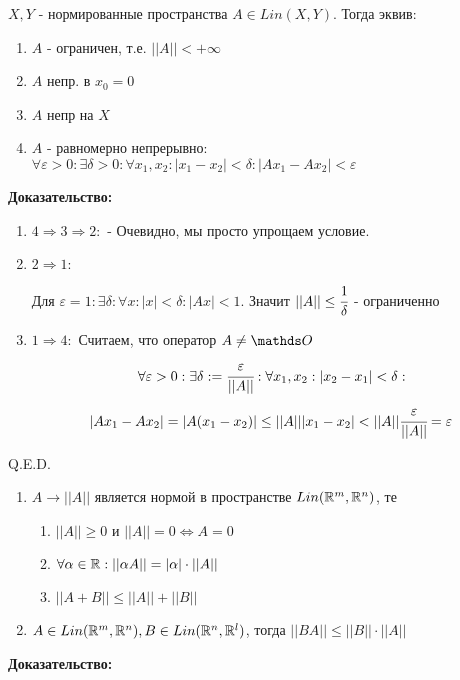 $X,Y$ - нормированные пространства $A \in Lin(X,Y)$. Тогда эквив:

\begin{enumerate}
    \item $A$ - ограничен, т.е. $||A|| < + \infty$
    \item $A$ непр. в $x_0 = 0$
    \item $A$ непр на $X$
    \item $A$ - равномерно непрерывно: $\forall \varepsilon >0:\exists \delta >0:\forall x_1,x_2:|x_1-x_2|<\delta: |Ax_1-Ax_2|<\varepsilon$
\end{enumerate}

\textbf{Доказательство:}

\begin{enumerate}
    

\item $4 \Rightarrow 3 \Rightarrow 2:$ - Очевидно, мы просто упрощаем условие.

\item $2 \Rightarrow 1:$

Для $\varepsilon = 1: \exists \delta : \forall x: |x|<\delta: |Ax|<1$. Значит $||A|| \leq \cfrac{1}{\delta}$ - ограниченно

\item $1 \Rightarrow 4:$ Считаем, что оператор $A \neq \zero$
$$\forall \varepsilon >0: \exists \delta := \cfrac{\varepsilon}{||A||}:\forall x_1,x_2:|x_2-x_1|<\delta:$$
$$|Ax_1-Ax_2| = |A(x_1-x_2)|\leq ||A|| |x_1-x_2| < ||A|| \cfrac{\varepsilon}{||A||}=\varepsilon$$
\end{enumerate}
\hfill Q.E.D.


\begin{enumerate}
    \item $A \rightarrow ||A||$ является нормой в пространстве $Lin(\mathbb{R}^m,\mathbb{R}^n)$, те
    \begin{enumerate}
        \item $||A|| \geq 0 $ и $||A|| = 0 \Leftrightarrow A =0$
        \item $\forall \alpha \in \mathbb{R}: ||\alpha A|| = |\alpha|\cdot ||A||$
        \item $||A+B||\leq ||A|| + ||B||$
    \end{enumerate}
    \item $A \in Lin(\mathbb{R}^m,\mathbb{R}^n), B \in Lin(\mathbb{R}^n,\mathbb{R}^l)$, тогда $||BA||\leq ||B|| \cdot ||A||$
\end{enumerate}
\textbf{Доказательство:}


